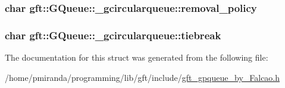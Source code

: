 \subsubsection[{\texorpdfstring{removal\+\_\+policy}{removal_policy}}]{\setlength{\rightskip}{0pt plus 5cm}char gft\+::\+G\+Queue\+::\+\_\+gcircularqueue\+::removal\+\_\+policy}\hypertarget{structgft_1_1GQueue_1_1__gcircularqueue_a345e7c12de26b812fbbd88694eb777f6}{}\label{structgft_1_1GQueue_1_1__gcircularqueue_a345e7c12de26b812fbbd88694eb777f6}
\subsubsection[{\texorpdfstring{tiebreak}{tiebreak}}]{\setlength{\rightskip}{0pt plus 5cm}char gft\+::\+G\+Queue\+::\+\_\+gcircularqueue\+::tiebreak}\hypertarget{structgft_1_1GQueue_1_1__gcircularqueue_a8c5f0458ca42a97a85f67e26d29ce844}{}\label{structgft_1_1GQueue_1_1__gcircularqueue_a8c5f0458ca42a97a85f67e26d29ce844}


The documentation for this struct was generated from the following file\+:\begin{DoxyCompactItemize}
\item 
/home/pmiranda/programming/lib/gft/include/\hyperlink{gft__gpqueue__by__Falcao_8h}{gft\+\_\+gpqueue\+\_\+by\+\_\+\+Falcao.\+h}\end{DoxyCompactItemize}
